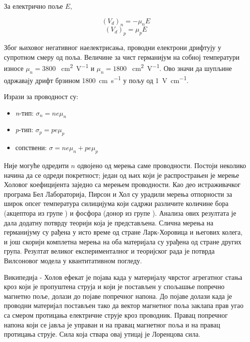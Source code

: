 \documentclass{article}
\newcommand{\rom}[1]{\uppercase\expandafter{\romannumeral #1\relax}}
\begin{document}
За електрично поље $E$,

\begin{equation} %
	(V_d)_n = - \mu_n E
\end{equation}
\begin{equation}
	(V_d)_p = \mu_p E
\end{equation}

Због њиховог негативног наелектрисања, проводни електрони дрифтују у супротном смеру од поља. Величине за чист германијум на собној температури износе $\mu_n = 3800$ \SI{}{\centi\meter\squared\per\volt} и $\mu_n = 1800$ \SI{}{\centi\meter\squared\per\volt}. Ово значи да шупљине одржавају дрифт брзином \SI{1800}{\centi\meter\per\second} у пољу од \SI{1}{\volt\per\centi\meter}.

Изрази за проводност су:
\begin{itemize}
	\item \textit{n}-тип: $\sigma_n = n e \mu_n $
	\item \textit{p}-тип: $\sigma_p = p e \mu_p $
	\item сопствени: $\sigma = n e \mu_n  + p e \mu_p$
\end{itemize}

Није могуће одредити $n$ одвојено од мерења саме проводности. Постоји неколико начина да се одреди покретност; један од њих који је распрострањен је мерење Холовог коефицијента заједно са мерењем проводности. Као део истраживачког програма Бел Лабораторија, Пирсон и Хол су урадили мерења отпорности за широк опсег температура силицијума који садржи различите количине бора (акцептора из групе \rom{3}) и фосфора (донор из групе \rom{5}). Анализа ових резултата је дала додатну потврду теорији која је представљена. Слична мерења на германијуму су рађена у исто време од стране Ларк-Хоровица и његових колега, и још скорији комплетна мерења на оба материјала су урађена од стране других група. Резултат великог експерименталног и теоријског рада је потврда Вилсоновог модела у квантитативном погледу. 

\begin{info}
	Википедија - Холов ефекат је појава када у материјалу чврстог агрегатног стања кроз који је пропуштена струја и који је постављен у спољашње попречно магнетно поље, долази до појаве попречног напона. До појаве долази када је проводни материјал постављен тако да вектор магнетног поља заклапа прав угао са смером протицања електричне струје кроз проводник. Правац попречног напона који се јавља је управан и на правац магнетног поља и на правац протицања струје. Сила која ствара овај утицај је Лоренцова сила.
\end{info}
\end{document}
